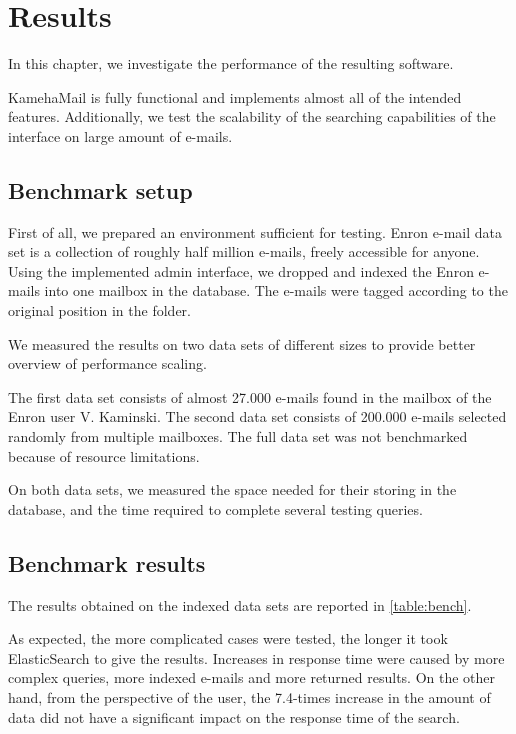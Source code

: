 \chapter{Results}
\label{results}
In this chapter, we investigate the performance of the resulting software.

KamehaMail is fully functional and implements almost all of the intended features. Additionally, we test the scalability of the searching capabilities of the interface on large amount of e-mails.

\section{Benchmark setup}
First of all, we prepared an environment sufficient for testing. Enron e-mail data set\cite{klimt2004enron} is a collection of roughly half million e-mails, freely accessible for anyone. Using the implemented admin interface, we dropped and indexed the Enron e-mails into one mailbox in the database. The e-mails were tagged according to the original position in the folder.

We measured the results on two data sets of different sizes to provide better overview of performance scaling.

The first data set consists of almost 27.000 e-mails found in the mailbox of the Enron user V. Kaminski. The second data set consists of 200.000 e-mails selected randomly from multiple mailboxes. The full data set was not benchmarked because of resource limitations.

On both data sets, we measured the space needed for their storing in the database, and the time required to complete several testing queries.

\section{Benchmark results}
The results obtained on the indexed data sets are reported in \autoref{table:bench}.

As expected, the more complicated cases were tested, the longer it took ElasticSearch to give the results. Increases in response time were caused by more complex queries, more indexed e-mails and more returned results. On the other hand, from the perspective of the user, the 7.4-times increase in the amount of data did not have a significant impact on the response time of the search. 

